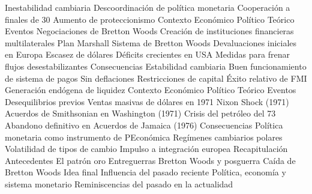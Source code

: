 \documentclass{nuevotema}
\begin{document}
\begin{esquema}[enumerate]
			\3 Inestabilidad cambiaria
			\3 Descoordinación de política monetaria
			\3 Cooperación a finales de 30
			\3 Aumento de proteccionismo
	\1 
		\2 Contexto
			\3 Económico
			\3 Político
			\3 Teórico
		\2 Eventos
			\3 Negociaciones de Bretton Woods
			\3 Creación de instituciones financieras multilaterales
			\3 Plan Marshall
			\3 Sistema de Bretton Woods
			\3 Devaluaciones iniciales en Europa
			\3 Escasez de dólares
			\3 Déficits crecientes en USA
			\3 Medidas para frenar flujos desestabilizantes
		\2 Consecuencias
			\3 Estabilidad cambiaria
			\3 Buen funcionamiento de sistema de pagos
			\3 Sin deflaciones
			\3 Restricciones de capital
			\3 Éxito relativo de FMI
			\3 Generación endógena de liquidez
	\1 
		\2 Contexto
			\3 Económico
			\3 Político
			\3 Teórico
		\2 Eventos
			\3 Desequilibrios previos
			\3 Ventas masivas de dólares en 1971
			\3 Nixon Shock (1971)
			\3 Acuerdos de Smithsonian en Washington (1971)
			\3 Crisis del petróleo del 73
			\3 Abandono definitivo en Acuerdos de Jamaica (1976)
		\2 Consecuencias
			\3 Política monetaria como instrumento de PEconómica
			\3 Regímenes cambiarios polares
			\3 Volatilidad de tipos de cambio
			\3 Impulso a integración europea
	\1[] 
		\2 Recapitulación
			\3 Antecedentes
			\3 El patrón oro
			\3 Entreguerras
			\3 Bretton Woods y posguerra
			\3 Caída de Bretton Woods
		\2 Idea final
			\3 Influencia del pasado reciente
			\3 Política, economía y sistema monetario
			\3 Reminiscencias del pasado en la actualidad

\end{esquema}

\esquemalargo
\end{document}
